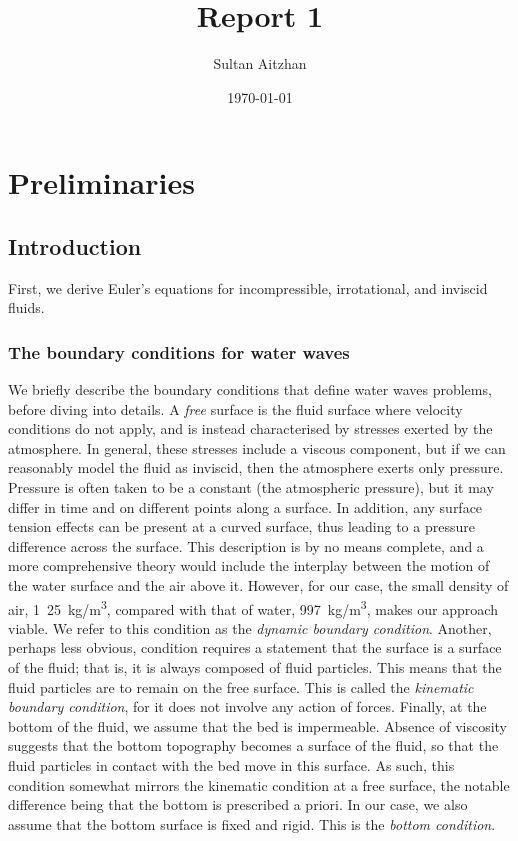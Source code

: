 \documentclass[10pt,reqno,oneside,a4paper]{article}
\author{Sultan Aitzhan}
\title{Report 1}
\date{\today}
\begin{document}
\maketitle
\thispagestyle{fancy}
\tableofcontents

\section{Preliminaries}

\subsection{Introduction}
First, we derive Euler's equations for incompressible, irrotational, and inviscid fluids. 

\subsubsection{The boundary conditions for water waves}

We briefly describe the boundary conditions that define water waves problems, before diving into details. A \emph{free} surface is the fluid surface where velocity conditions do not apply, and is instead characterised by stresses exerted by the atmosphere. In general, these stresses include a viscous component, but if we can reasonably model the fluid as inviscid, then the atmosphere exerts only pressure. Pressure is often taken to be a constant (the atmospheric pressure), but it may differ in time and on different points along a surface. In addition, any surface tension effects can be present at a curved surface, thus leading to a pressure difference across the surface. This description is by no means complete, and a more comprehensive theory would include the interplay between the motion of the water surface and the air above it. However, for our case, the small density of air, \si[per-mode=symbol]{1.25 \kilogram\per\meter\cubed}, compared with that of water, \si[per-mode=symbol]{997 \kilogram\per\meter\cubed}, makes our approach viable. We refer to this condition as the \emph{dynamic boundary condition}. Another, perhaps less obvious, condition requires a statement that the surface is a surface of the fluid; that is, it is always composed of fluid particles. This means that the fluid particles are to remain on the free surface. This is called the \emph{kinematic boundary condition}, for it does not involve any action of forces. Finally, at the bottom of the fluid, we assume that the bed is impermeable. Absence of viscosity suggests that the bottom topography becomes a surface of the fluid, so that the fluid particles in contact with the bed move in this surface. As such, this condition somewhat mirrors the kinematic condition at a free surface, the notable difference being that the bottom is prescribed a priori. In our case, we also assume that the bottom surface is fixed and rigid. This is the \emph{bottom condition}.
\end{document}
